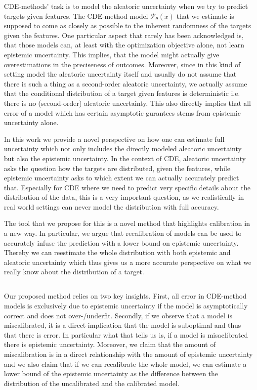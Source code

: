 CDE-methods' task is to model the aleatoric uncertainty when we try to predict targets given features. The CDE-method model $\mathcal{P}_\theta(x)$ that we estimate is supposed to come as closely as possible to the inherent randomness of the targets given the features. One particular aspect that rarely has been acknowledged is, that those models can, at least with the optimization objective alone, not learn epistemic uncertainty. This implies, that the model might actually give overestimations in the preciseness of outcomes. Moreover, since in this kind of setting model the aleatoric uncertainty itself and usually do not assume that there is such a thing as a second-order aleatoric uncertainty, we actually assume that the conditional distribution of a target given features is deterministic i.e. there is no (second-order) aleatoric uncertainty. This also directly implies that all error of a model which has certain asymptotic gurantees stems from epistemic uncertainty alone.

In this work we provide a novel perspective on how one can estimate full uncertainty which not only includes the directly modeled aleatoric uncertainty but also the epistemic uncertainty. In the context of CDE, aleatoric uncertainty asks the question how the targets are distributed, given the features, while epistemic uncertainty asks to which extent we can actually accurately predict that. Especially for CDE where we need to predict very specific details about the distribution of the data, this is a very important question, as we realistically in real world settings can never model the distribution with full accuracy.

The tool that we propose for this is a novel method that highlights calibration in a new way. In particular, we argue that recalibration of models can be used to accurately infuse the prediction with a lower bound on epistemic uncertainty. Thereby we can reestimate the whole distribution with both epistemic and aleatoric uncertainty which thus gives us a more accurate perspective on what we really know about the distribution of a target.

\subsection{}

Our proposed method relies on two key insights. First, all error in CDE-method models is exclusively due to epistemic uncertainty if the model is asymptotically correct and does not over-/underfit. Secondly, if we observe that a model is miscalibrated, it is a direct implication that the model is suboptimal and thus that there is error. In particular what that tells us is, if a model is misaclibrated there is epistemic uncertainty. Moreover, we claim that the amount of miscalibration is in a direct relationship with the amount of epistemic uncertainty and we also claim that if we can recalibrate the whole model, we can estimate a lower bound of the epistemic uncertainty as the difference between the distribution of the uncalibrated and the calibrated model.

